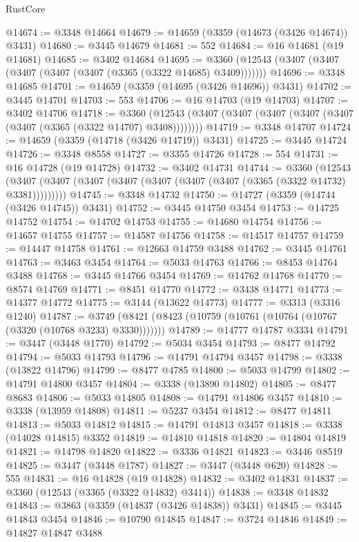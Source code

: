 \begin{lexlean}{RustCore}
\begin{coremodule}
@14674 := @3348 @14664
@14679 := @14659 (@3359 (@14673 (@3426 @14674)) @3431)
@14680 := @3445 @14679
@14681 := 552
@14684 := @16 @14681 (@19 @14681)
@14685 := @3402 @14684
@14695 := @3360 (@12543 (@3407 (@3407 (@3407 (@3407 (@3407 (@3365 (@3322 @14685) @3409)))))))
@14696 := @3348 @14685
@14701 := @14659 (@3359 (@14695 (@3426 @14696)) @3431)
@14702 := @3445 @14701
@14703 := 553
@14706 := @16 @14703 (@19 @14703)
@14707 := @3402 @14706
@14718 := @3360
    (@12543 (@3407 (@3407 (@3407 (@3407 (@3407 (@3407 (@3365 (@3322 @14707) @3408))))))))
@14719 := @3348 @14707
@14724 := @14659 (@3359 (@14718 (@3426 @14719)) @3431)
@14725 := @3445 @14724
@14726 := @3348 @8558
@14727 := @3355 @14726
@14728 := 554
@14731 := @16 @14728 (@19 @14728)
@14732 := @3402 @14731
@14744 := @3360
    (@12543 (@3407 (@3407 (@3407 (@3407 (@3407 (@3407 (@3407 (@3365 (@3322 @14732) @3381)))))))))
@14745 := @3348 @14732
@14750 := @14727 (@3359 (@14744 (@3426 @14745)) @3431)
@14752 := @3445 @14750 @3454
@14753 := @14725 @14752
@14754 := @14702 @14753
@14755 := @14680 @14754
@14756 := @14657 @14755
@14757 := @14587 @14756
@14758 := @14517 @14757
@14759 := @14447 @14758
@14761 := @12663 @14759 @3488
@14762 := @3445 @14761
@14763 := @3463 @3454
@14764 := @5033 @14763
@14766 := @8453 @14764 @3488
@14768 := @3445 @14766 @3454
@14769 := @14762 @14768
@14770 := @8574 @14769
@14771 := @8451 @14770
@14772 := @3438 @14771
@14773 := @14377 @14772
@14775 := @3144 (@13622 @14773)
@14777 := @3313 (@3316 @1240)
@14787 := @3749 (@8421 (@8423 (@10759 (@10761 (@10764 (@10767 (@3320 (@10768 @3233) @3330)))))))
@14789 := @14777 @14787 @3334
@14791 := @3447 (@3448 @1770)
@14792 := @5034 @3454
@14793 := @8477 @14792
@14794 := @5033 @14793
@14796 := @14791 @14794 @3457
@14798 := @3338 (@13822 @14796)
@14799 := @8477 @4785
@14800 := @5033 @14799
@14802 := @14791 @14800 @3457
@14804 := @3338 (@13890 @14802)
@14805 := @8477 @8683
@14806 := @5033 @14805
@14808 := @14791 @14806 @3457
@14810 := @3338 (@13959 @14808)
@14811 := @5237 @3454
@14812 := @8477 @14811
@14813 := @5033 @14812
@14815 := @14791 @14813 @3457
@14818 := @3338 (@14028 @14815) @3352
@14819 := @14810 @14818
@14820 := @14804 @14819
@14821 := @14798 @14820
@14822 := @3336 @14821
@14823 := @3446 @8519
@14825 := @3447 (@3448 @1787)
@14827 := @3447 (@3448 @620)
@14828 := 555
@14831 := @16 @14828 (@19 @14828)
@14832 := @3402 @14831
@14837 := @3360 (@12543 (@3365 (@3322 @14832) @3414))
@14838 := @3348 @14832
@14843 := @3863 (@3359 (@14837 (@3426 @14838)) @3431)
@14845 := @3445 @14843 @3454
@14846 := @10790 @14845
@14847 := @3724 @14846
@14849 := @14827 @14847 @3488

\end{coremodule}
\end{lexlean}

